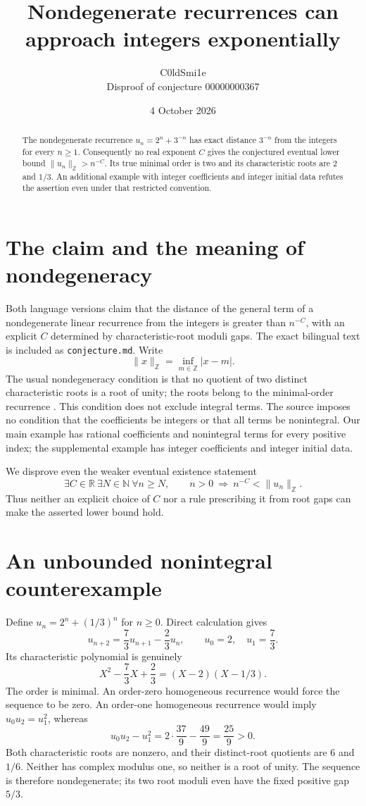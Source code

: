 \documentclass[10pt]{article}
\title{Nondegenerate recurrences can approach integers exponentially}
\author{C0ldSmi1e\\\small Disproof of conjecture 00000000367}
\date{4 October 2026}
\newcommand{\Z}{\mathbb Z}
\newcommand{\R}{\mathbb R}
\newcommand{\distZ}[1]{\lVert #1\rVert_{\Z}}
\begin{document}
\maketitle
\begin{abstract}
The nondegenerate recurrence $u_n=2^n+3^{-n}$ has exact distance $3^{-n}$ from the integers for every $n\ge1$. Consequently no real exponent $C$ gives the conjectured eventual lower bound $\distZ{u_n}>n^{-C}$. Its true minimal order is two and its characteristic roots are $2$ and $1/3$. An additional example with integer coefficients and integer initial data refutes the assertion even under that restricted convention.
\end{abstract}

\section{The claim and the meaning of nondegeneracy}
Both language versions claim that the distance of the general term of a nondegenerate linear recurrence from the integers is greater than $n^{-C}$, with an explicit $C$ determined by characteristic-root moduli gaps. The exact bilingual text is included as \texttt{conjecture.md}. Write
\[
 \distZ{x}=\inf_{m\in\Z}|x-m|.
\]
The usual nondegeneracy condition is that no quotient of two distinct characteristic roots is a root of unity; the roots belong to the minimal-order recurrence \cite{dcosta}. This condition does not exclude integral terms. The source imposes no condition that the coefficients be integers or that all terms be nonintegral. Our main example has rational coefficients and nonintegral terms for every positive index; the supplemental example has integer coefficients and integer initial data.

We disprove even the weaker eventual existence statement
\[
 \exists C\in\R\ \exists N\in\mathbb N\ \forall n\ge N,
 \qquad n>0\ \Longrightarrow\ n^{-C}<\distZ{u_n}.
 \tag{1}
\]
Thus neither an explicit choice of $C$ nor a rule prescribing it from root gaps can make the asserted lower bound hold.

\section{An unbounded nonintegral counterexample}
Define $u_n=2^n+(1/3)^n$ for $n\ge0$. Direct calculation gives
\[
 u_{n+2}=\frac73u_{n+1}-\frac23u_n,
 \qquad u_0=2,\quad u_1=\frac73.
\]
Its characteristic polynomial is genuinely
\[
 X^2-\frac73 X+\frac23=(X-2)(X-1/3).
\]
The order is minimal. An order-zero homogeneous recurrence would force the sequence to be zero. An order-one homogeneous recurrence would imply $u_0u_2=u_1^2$, whereas
\[
 u_0u_2-u_1^2=2\cdot\frac{37}{9}-\frac{49}{9}=\frac{25}{9}>0.
\]
Both characteristic roots are nonzero, and their distinct-root quotients are $6$ and $1/6$. Neither has complex modulus one, so neither is a root of unity. The sequence is therefore nondegenerate; its two root moduli even have the fixed positive gap $5/3$.
\end{document}
